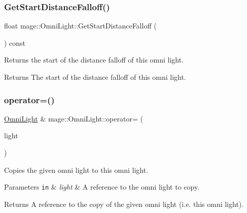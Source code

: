 \subsubsection{\texorpdfstring{Get\+Start\+Distance\+Falloff()}{GetStartDistanceFalloff()}}
{\footnotesize\ttfamily float mage\+::\+Omni\+Light\+::\+Get\+Start\+Distance\+Falloff (\begin{DoxyParamCaption}{ }\end{DoxyParamCaption}) const\hspace{0.3cm}{\ttfamily [noexcept]}}

Returns the start of the distance falloff of this omni light.

\begin{DoxyReturn}{Returns}
The start of the distance falloff of this omni light. 
\end{DoxyReturn}
\hypertarget{classmage_1_1_omni_light_a7bdce151d327daef5e1f31daedcc4627}{}\label{classmage_1_1_omni_light_a7bdce151d327daef5e1f31daedcc4627} 
\subsubsection{\texorpdfstring{operator=()}{operator=()}\hspace{0.1cm}{\footnotesize\ttfamily [1/2]}}
{\footnotesize\ttfamily \hyperlink{classmage_1_1_omni_light}{Omni\+Light} \& mage\+::\+Omni\+Light\+::operator= (\begin{DoxyParamCaption}\item[{const \hyperlink{classmage_1_1_omni_light}{Omni\+Light} \&}]{light }\end{DoxyParamCaption})\hspace{0.3cm}{\ttfamily [default]}}

Copies the given omni light to this omni light.


\begin{DoxyParams}[1]{Parameters}
\mbox{\tt in}  & {\em light} & A reference to the omni light to copy. \\
\hline
\end{DoxyParams}
\begin{DoxyReturn}{Returns}
A reference to the copy of the given omni light (i.\+e. this omni light). 
\end{DoxyReturn}
\hypertarget{classmage_1_1_omni_light_a287a54dede61e65efe4493ec20531428}{}\label{classmage_1_1_omni_light_a287a54dede61e65efe4493ec20531428} 
